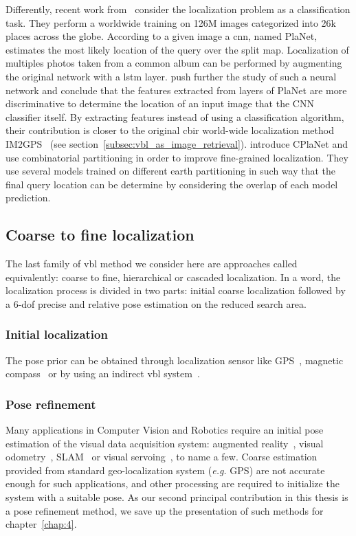 Differently, recent work from~\citet{Weyand2016} consider the localization problem as a classification task. They perform a worldwide training on 126M images categorized into 26k places across the globe. According to a given image a \ac{cnn}, named PlaNet, estimates the most likely location of the query over the split map. Localization of multiples photos taken from a common album can be performed by augmenting the original network with a \ac{lstm} layer. \citet{Vo2017} push further the study of such a neural network and conclude that the features extracted from layers of PlaNet are more discriminative to determine the location of an input image that the CNN classifier itself. By extracting features instead of using a classification algorithm, their contribution is closer to the original \ac{cbir} world-wide localization method IM2GPS~\citep{Hays2008} (see section~\ref{subsec:vbl_as_image_retrieval}). \citet{Seo2018} introduce CPlaNet and use combinatorial partitioning in order to improve fine-grained localization. They use several models trained on different earth partitioning in such way that the final query location can be determine by considering the overlap of each model prediction.

\subsection{Coarse to fine localization}
\label{subsec:vbl_prior}
The last family of \ac{vbl} method we consider here are approaches called equivalently: coarse to fine, hierarchical or cascaded localization. In a word, the localization process is divided in two parts: initial coarse localization followed by a 6-\ac{dof} precise and relative pose estimation on the reduced search area. 

\subsubsection{Initial localization}
The pose prior can be obtained through localization sensor like GPS~\citep{Chen2011,Arth2015,Poglitsch2015}, magnetic compass~\citep{Svarm2014,Zeisl2015,Svarm2016} or by using an indirect \ac{vbl} system~\citep{Torii2011,Song2016,Sattler2017,Sarlin2018a,Sarlin2018,Rocco2018,Sattler2017,Piasco2019a,Taira2018,Dusmanu2019}. 


\subsubsection{Pose refinement}
Many applications in Computer Vision and Robotics require an initial pose estimation of the visual data acquisition system: augmented reality~\citep{Arth2015}, visual odometry~\citep{Pascoe2015a}, SLAM~\citep{Milford2012} or visual servoing~\citep{Marchand2016}, to name a few. Coarse estimation provided from standard geo-localization system (\textit{e.g.} GPS) are not accurate enough for such applications, and other processing are required to initialize the system with a suitable pose. As our second principal contribution in this thesis is a pose refinement method, we save up the presentation of such methods for chapter~\ref{chap:4}.

